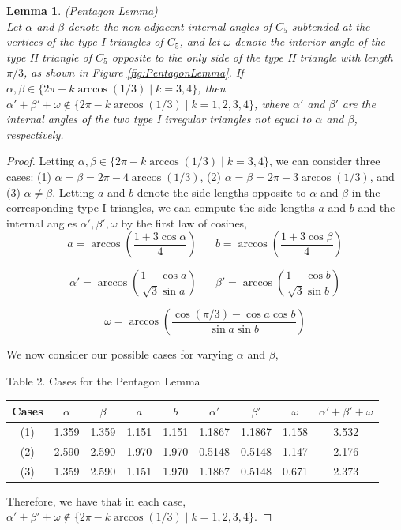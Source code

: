 \documentclass[10pt]{article}
\newtheorem{Lemma}{Lemma}
\numberwithin{Subcase}{Case}
\begin{document}
\begin{Lemma}(Pentagon Lemma) \\
Let $\alpha$ and $\beta$ denote the non-adjacent internal angles of $C_5$ subtended at the vertices of the type I triangles of $C_5$, and let $\omega$ denote the interior angle of the type II triangle of $C_5$ opposite to the only side of the type II triangle with length $\pi/3$, as shown in Figure \ref{fig:PentagonLemma}. If $\alpha, \beta \in \{2\pi-k\arccos(1/3) \; | \; k=3,4\}$, then $\alpha' + \beta' + \omega \notin \{2\pi - k\arccos(1/3) \; | \; k=1,2,3,4\}$, where $\alpha'$ and $\beta'$ are the internal angles of the two type I irregular triangles not equal to $\alpha$ and $\beta$, respectively.
\end{Lemma}
\begin{proof}
Letting $\alpha, \beta \in \{2\pi-k\arccos(1/3) \; | \; k=3,4\}$, we can consider three cases: (1) $\alpha=\beta=2\pi - 4\arccos(1/3)$, (2) $\alpha=\beta=2\pi - 3\arccos(1/3)$, and (3) $\alpha \neq \beta$. Letting $a$ and $b$ denote the side lengths opposite to $\alpha$ and $\beta$ in the corresponding type I triangles, we can compute the side lengths $a$ and $b$ and the internal angles $\alpha',\beta',\omega$ by the first law of cosines,
\begin{equation*}
a = \arccos\left(\frac{1+3\cos\alpha}{4}\right) \;\;\;\;\;\; b = \arccos\left(\frac{1+3\cos\beta}{4}\right)
\end{equation*}

\begin{equation*}
\alpha'=\arccos\left(\frac{1-\cos a}{\sqrt{3}\sin a}\right) \;\;\;\;\;\;
\beta'=\arccos\left(\frac{1-\cos b}{\sqrt{3}\sin b}\right)
\end{equation*}

\begin{equation*}
\omega = \arccos\left(\frac{\cos(\pi/3)-\cos a \cos b}{\sin a \sin b}\right)
\end{equation*}

We now consider our possible cases for varying $\alpha$ and $\beta$,
\begin{center}
Table 2. Cases for the Pentagon Lemma
\begin{tabular}{| c | c | c | c | c | c | c | c | c |} 
\hline
Cases & $\alpha$ & $\beta$ & $a$ & $b$ & $\alpha'$ & $\beta'$ & $\omega$ & $\alpha' + \beta' + \omega$ \\ \hline
(1) & 1.359 & 1.359 & 1.151 & 1.151 & 1.1867 & 1.1867 & 1.158 & 3.532 \\ \hline
(2) & 2.590 & 2.590 & 1.970 & 1.970 & 0.5148 & 0.5148 & 1.147 & 2.176 \\ \hline
(3) & 1.359 & 2.590 & 1.151 & 1.970 & 1.1867 & 0.5148 & 0.671 & 2.373 \\ \hline
\end{tabular}
\end{center}
Therefore, we have that in each case,
$\alpha' + \beta' + \omega \notin \{2\pi - k\arccos(1/3) \; | \; k=1,2,3,4\}$.
\end{proof}
\end{document}

